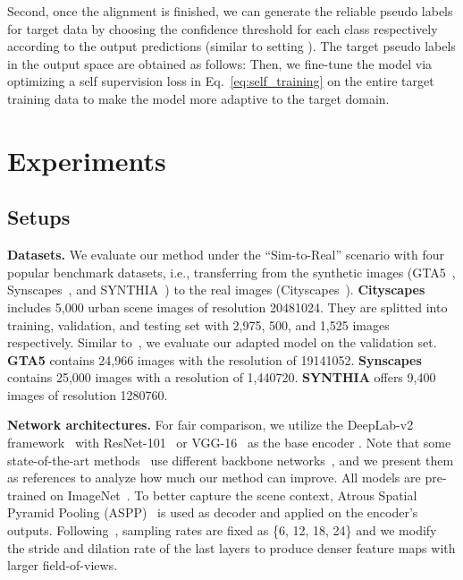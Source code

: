 \documentclass[runningheads]{llncs}
\begin{document}
Second, once the alignment is finished, we can generate the reliable pseudo labels for target data by choosing the confidence threshold  for each class respectively according to the output predictions  (similar to setting ). The target pseudo labels in the output space are obtained as follows: 
Then, we fine-tune the model via optimizing a self supervision loss  in Eq.~\eqref{eq:self_training} on the entire target training data to make the model more adaptive to the target domain.
 \begin{small}
    
\end{small}




\section{Experiments}
\subsection{Setups}
\textbf{Datasets.} We evaluate our method under the ``Sim-to-Real'' scenario with four popular benchmark datasets, i.e., transferring from the synthetic images (GTA5~\cite{stephan2016gtav}, Synscapes~\cite{wrenninge2018synscapes}, and SYNTHIA~\cite{ros2016synthia}) to the real images (Cityscapes~\cite{Cordts2016Cityscapes}). {\bf Cityscapes} includes 5,000 urban scene images of resolution 20481024. They are splitted into training, validation, and testing set with 2,975, 500, and 1,525 images respectively. Similar to~\cite{tsai2018learning,zou2019confidence}, we evaluate our adapted model on the validation set.
{\bf GTA5} contains 24,966 images with the resolution of 19141052. {\bf Synscapes} contains 25,000 images with a resolution of 1,440720. {\bf SYNTHIA} offers 9,400 images of resolution 1280760. 

\textbf{Network architectures.} For fair comparison, we utilize the DeepLab-v2 framework~\cite{chen2018deeplab} with ResNet-101~\cite{he2016deep} or VGG-16~\cite{simonyan2015vgg} as the base encoder . Note that some state-of-the-art methods~\cite{lian2019pycda,zhang2019category} use different backbone networks~\cite{chen2018encoderdecoder,zhao2017pspnet}, and we present them as references to analyze how much our method can improve. All models are pre-trained on ImageNet~\cite{deng2009imagenet}. To better capture the scene context, Atrous Spatial Pyramid Pooling (ASPP)~\cite{chen2018deeplab} is used as decoder  and applied on the encoder's outputs. Following~\cite{luo2019taking,tsai2018learning,zou2019confidence}, sampling rates are fixed as \{6, 12, 18, 24\} and we modify the stride and dilation rate of the last layers to produce denser feature maps with larger field-of-views.
\end{document}
